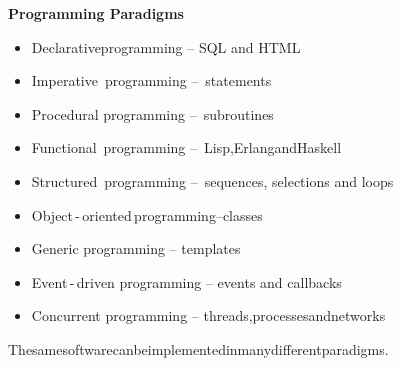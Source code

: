 \documentclass{beamer}
\begin{document}
\begin{frame}{\bf Programming Paradigms}
    
    \begin{itemize}

        \item Declarative\;programming -- SQL and HTML

        \item Imperative\, programming -- \,statements

        \item Procedural programming -- \,subroutines

        \item Functional\, programming -- \,Lisp,\:Erlang\:and\:Haskell
        
        \item Structured\, programming -- \,sequences, selections and loops 
        
        \item Object\,-\,oriented\,programming\;--\;classes
        
        \item Generic programming -- templates

        \item Event\,-\,driven programming -- events and callbacks
        
        \item Concurrent programming -- threads,\;processes\;and\;networks
        
    \end{itemize}

    \begin{block}
    \justifying The\:same\:software\:can\:be\:implemented\:in\:many\:different\:paradigms.
    \end{block}
    
\end{frame}
\end{document}
